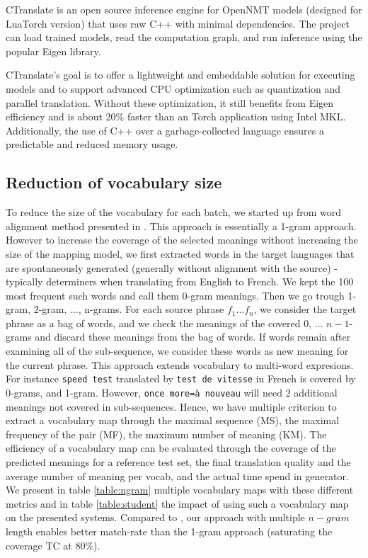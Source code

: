 \documentclass[11pt,a4paper]{article}
\begin{document}
CTranslate is an open source inference engine for OpenNMT models (designed for LuaTorch version) that uses raw C++ with minimal dependencies. The project can load trained models, read the computation graph, and run inference using the popular Eigen library.

CTranslate's goal is to offer a lightweight and embeddable solution for executing models and to support advanced CPU optimization such as quantization and parallel translation. Without these optimization, it still benefits from Eigen efficiency and is about 20\% faster than an Torch application using Intel MKL. Additionally, the use of C++ over a garbage-collected language ensures a predictable and reduced memory usage.


\subsection{Reduction of vocabulary size}
To reduce the size of the vocabulary for each batch, we started up from word alignment method presented in \cite{shi2017speeding}. This approach is essentially a 1-gram approach. However to increase the coverage of the selected meanings without increasing the size of the mapping model, we first extracted words in the target languages that are spontaneously generated (generally without alignment with the source) - typically determiners when translating from English to French. We kept the 100 most frequent such words and call them 0-gram meanings. Then we go trough 1-gram, 2-gram, ..., n-grams. For each source phrase $f_1 ... f_n$, we consider the target phrase as a bag of words, and we check the meanings of the covered $0$, ... $n-1$-grams and discard these meanings from the bag of words. If words remain after examining all of the sub-sequence, we consider these words as new meaning for the current phrase. This approach extends vocabulary to multi-word expresions. For instance {\tt speed test} translated by {\tt test de vitesse} in French is covered by 0-grams, and 1-gram. However, {\tt once more=à nouveau} will need 2 additional meanings not covered in sub-sequences. Hence, we have multiple criterion to extract a vocabulary map through the maximal sequence (MS), the maximal frequency of the pair (MF), the maximum number of meaning (KM). The efficiency of a vocabulary map can be evaluated through the coverage of the predicted meanings  for a reference test set, the final translation quality and the average number of meaning per vocab, and the actual time spend in generator. 
We present in table \ref{table:ngram} multiple vocabulary maps with these different metrics and in table \ref{table:student} the impact of using such a vocabulary map on the presented systems. Compared to \cite{shi2017speeding}, our approach with multiple $n-gram$ length enables better match-rate than the 1-gram approach (saturating the coverage TC at 80\%).
 
\end{document}
